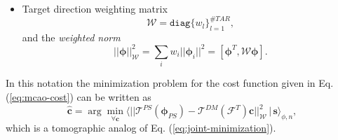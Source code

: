 \begin{itemize}
	\item Target direction weighting matrix
  \begin{equation} \label{eq:direction-weight}
		\mathcal{W} = \texttt{diag} \{ w_{l} \}_{l=1}^{\#TAR},
	\end{equation}
	and the \emph{weighted norm} 
	\begin{equation} \label{eq:weighted-norm}
		|| \bm{\phi} ||^{2}_{\mathcal{W}} =
		\sum_{i} w_{i} || \bm{\phi}_{i} ||^{2} =
		[ \bm{\phi}^{T}, \mathcal{W} \bm{\phi} ].
	\end{equation}

\end{itemize}
In this notation the minimization problem for the cost function given in Eq.
(\ref{eq:mcao-cost}) can be written as
\begin{equation} \label{eq:mcao-minimization}
	\hat{\bm{c}} = \arg \min_{\forall \bm{c}}
	\langle
	||
	\mathcal{T}^{PS} (\bm{\phi}_{PS}) -
	\mathcal{T}^{DM} (\mathcal{F}^{T}) \bm{c}
	||^{2}_{\mathcal{W}} \,|\, \bm{s}
	\rangle_{\phi,n},
\end{equation}
which is a tomographic analog of Eq. (\ref{eq:joint-minimization}).

